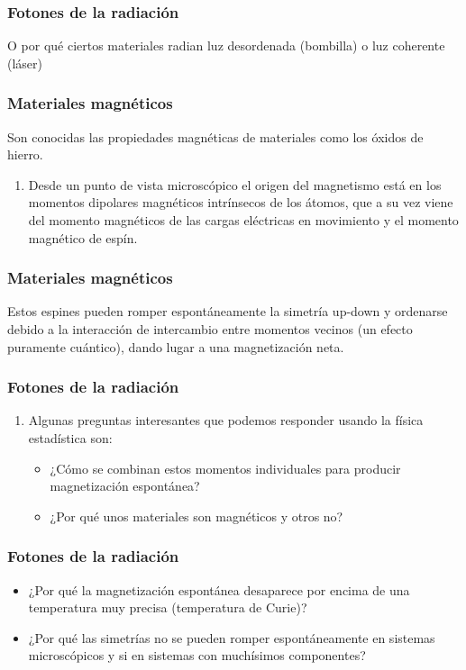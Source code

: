 \documentclass[12pt]{beamer}
\begin{document}
\begin{frame}
\frametitle{Fotones de la radiación} 
O por qué ciertos materiales radian luz desordenada (bombilla) o luz coherente (láser)
\end{frame}
\begin{frame}
\frametitle{Materiales magnéticos}
Son conocidas las propiedades magnéticas de materiales como los óxidos de hierro.
\pause 
{}
\begin{enumerate}[<+->]
\item Desde un punto de vista microscópico el origen del magnetismo está en los momentos dipolares magnéticos intrínsecos de los átomos, que a su vez viene del momento magnéticos de las cargas eléctricas en movimiento y el momento magnético de espín.
\seti
\end{enumerate}
\end{frame}
\begin{frame}
\frametitle{Materiales magnéticos}
Estos espines pueden romper espontáneamente la simetría up-down y ordenarse debido a la interacción de intercambio entre momentos vecinos (un efecto puramente cuántico), dando lugar a una magnetización neta.
\end{frame}
\begin{frame}
\frametitle{Fotones de la radiación}
\begin{enumerate}[<+->]
\conti
\item Algunas preguntas interesantes que podemos responder usando la física estadística son:
\begin{itemize}[<+->]
\item ¿Cómo se combinan estos momentos individuales para producir magnetización espontánea?
\item ¿Por qué unos materiales son magnéticos y otros no?
\end{itemize}
\end{enumerate}
\end{frame}
\begin{frame}
\frametitle{Fotones de la radiación}
\begin{itemize}[<+->]  
\item ¿Por qué la magnetización espontánea desaparece por encima de una temperatura muy precisa (temperatura de Curie)?
\item ¿Por qué las simetrías no se pueden romper espontáneamente en sistemas microscópicos y si en sistemas con muchísimos componentes?
\end{itemize}
\end{frame}
\end{document}
